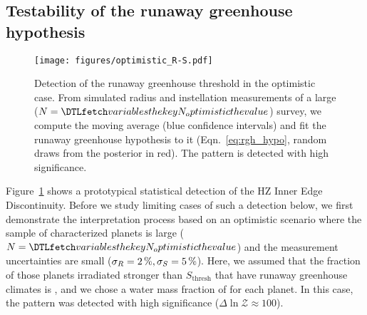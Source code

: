 \documentclass[twocolumn,twocolappendix]{aastex631}
\begin{document}
\subsection{Testability of the runaway greenhouse hypothesis}\label{sec:res_testability}
\begin{figure}[ht!]
    \begin{centering}
        \texttt{[image: figures/optimistic\_R-S.pdf]}
        \caption{
        Detection of the runaway greenhouse threshold in the optimistic case.
        From simulated radius and instellation measurements of a large ($N = \var{N_optimistic}$) survey, we compute the moving average (blue confidence intervals) and fit the runaway greenhouse hypothesis to it (Eqn.~\ref{eq:rgh_hypo}, random draws from the posterior in red).
            The pattern is detected with high significance.
        }
        \label{fig:optimistic_R-S}
    \end{centering}
\end{figure}
Figure~\ref{fig:optimistic_R-S} shows a prototypical statistical detection of the HZ Inner Edge Discontinuity.
Before we study limiting cases of such a detection below, we first demonstrate the interpretation process based on an optimistic scenario where the sample of characterized planets is large ($N = \var{N_optimistic}$) and the measurement uncertainties are small ($\sigma_{R} = \SI{2}{\percent}, \sigma_{S} = \SI{5}{\percent}$).
Here, we assumed that the fraction of those planets irradiated stronger than $S_\mathrm{thresh}$ that have runaway greenhouse climates is \frgh, and we chose a water mass fraction of  for each planet.
In this case, the pattern was detected with high significance ($\Delta \ln \mathcal{Z} \approx 100$).
\end{document}
